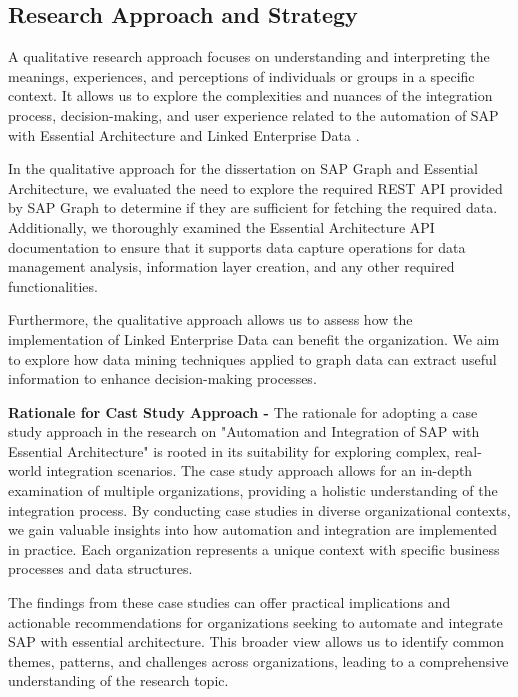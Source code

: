 \documentclass{article}
\begin{document}
\maketitle
\subsection{Research Approach and Strategy}
A qualitative research approach focuses on understanding and interpreting the meanings, experiences, and perceptions of individuals or groups in a specific context. It allows us to explore the complexities and nuances of the integration process, decision-making, and user experience related to the automation of SAP with Essential Architecture and Linked Enterprise Data \parencite{hammarberg2016}.

In the qualitative approach for the dissertation on SAP Graph and Essential Architecture, we evaluated the need to explore the required REST API provided by SAP Graph to determine if they are sufficient for fetching the required data. Additionally, we thoroughly examined the Essential Architecture API documentation to ensure that it supports data capture operations for data management analysis, information layer creation, and any other required functionalities.

Furthermore, the qualitative approach allows us to assess how the implementation of Linked Enterprise Data can benefit the organization. We aim to explore how data mining techniques applied to graph data can extract useful information to enhance decision-making processes.

\textbf{Rationale for Cast Study Approach -}
The rationale for adopting a case study approach in the research on "Automation and Integration of SAP with Essential Architecture" is rooted in its suitability for exploring complex, real-world integration scenarios. The case study approach allows for an in-depth examination of multiple organizations, providing a holistic understanding of the integration process. By conducting case studies in diverse organizational contexts, we gain valuable insights into how automation and integration are implemented in practice. Each organization represents a unique context with specific business processes and data structures.

The findings from these case studies can offer practical implications and actionable recommendations for organizations seeking to automate and integrate SAP with essential architecture. This broader view allows us to identify common themes, patterns, and challenges across organizations, leading to a comprehensive understanding of the research topic.
\end{document}
